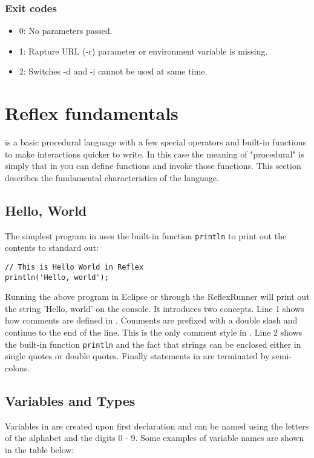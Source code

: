 \subsection{Exit codes}
\begin{itemize}
\item{0: No parameters passed.}
\item{1: Rapture URL (-r) parameter or environment variable is missing.}
\item{2: Switches -d and -i cannot be used at same time.}
\end{itemize}

\chapter{Reflex fundamentals}
\Reflex is a basic procedural language with a few special operators  and built-in functions  to make \Rapture interactions quicker to write. In this case the meaning of "procedural" is simply that in \Reflex you can define functions and invoke those functions. This section describes the fundamental characteristics of the language.
\section{Hello, World}
The simplest program in \Reflex uses the built-in function \Verb+println+  to print out the contents to standard out:
\begin{lstlisting}[caption={Hello world}]
// This is Hello World in Reflex
println('Hello, world');

\end{lstlisting}

Running the above program in Eclipse or through the ReflexRunner will print out the string 'Hello, world' on the console. It introduces two concepts. Line 1 shows how comments are defined in \Reflex. Comments are prefixed with a double slash and continue to the end of the line. This is the only comment style in \Reflex. Line 2 shows the built-in function \Verb+println+ and the fact that strings can be enclosed either in single quotes or double quotes. Finally statements in \Reflex are terminated by semi-colons.

\section{Variables and Types}

Variables  in \Reflex are created upon first declaration and can be named using the letters of the alphabet and the digits 0 - 9. Some examples of variable names are shown in the table below:

